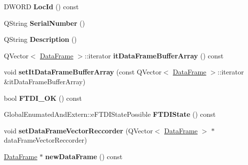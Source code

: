 \begin{DoxyCompactItemize}
\mbox{\label{class_f_t_d_i_function_aeed0b348ff4bd08c35af0fabe7eba480}} 
D\+W\+O\+RD {\bfseries Loc\+Id} () const
\item 
\mbox{\label{class_f_t_d_i_function_a95e14b4e6fc8a517e10a94c533f1a333}} 
Q\+String {\bfseries Serial\+Number} ()
\item 
\mbox{\label{class_f_t_d_i_function_a117bafcd4ce4fb4eab3bf430f65bbe36}} 
Q\+String {\bfseries Description} ()
\item 
\mbox{\label{class_f_t_d_i_function_a0ae795e7a2e959460ba33aaea70125b2}} 
Q\+Vector$<$ \hyperlink{class_data_frame}{Data\+Frame} $>$\+::iterator {\bfseries it\+Data\+Frame\+Buffer\+Array} () const
\item 
\mbox{\label{class_f_t_d_i_function_acf09dba6ad81850e567177ac9e3be1df}} 
void {\bfseries set\+It\+Data\+Frame\+Buffer\+Array} (const Q\+Vector$<$ \hyperlink{class_data_frame}{Data\+Frame} $>$\+::iterator \&it\+Data\+Frame\+Buffer\+Array)
\item 
\mbox{\label{class_f_t_d_i_function_ae9a60ee5b4c39335d7f63f70cf34c448}} 
bool {\bfseries F\+T\+D\+I\+\_\+\+OK} () const
\item 
\mbox{\label{class_f_t_d_i_function_a61e1640cbad8644cba78a29a785d213c}} 
Global\+Enumated\+And\+Extern\+::e\+F\+T\+D\+I\+State\+Possible {\bfseries F\+T\+D\+I\+State} () const
\item 
\mbox{\label{class_f_t_d_i_function_a6abb777365403b9908f9216730f7e010}} 
void {\bfseries set\+Data\+Frame\+Vector\+Reccorder} (Q\+Vector$<$ \hyperlink{class_data_frame}{Data\+Frame} $>$ $\ast$data\+Frame\+Vector\+Reccorder)
\item 
\mbox{\label{class_f_t_d_i_function_a618e538579d45d70d800941928c2b7e2}} 
\hyperlink{class_data_frame}{Data\+Frame} $\ast$ {\bfseries new\+Data\+Frame} () const
\item 
\mbox{\label{class_f_t_d_i_function_a7e884e968acc8d62f151636e2117e9b8}} 

\end{DoxyCompactItemize}
